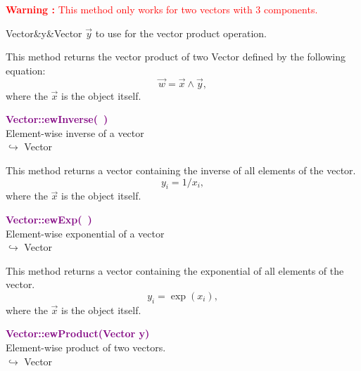 \hspace*{10mm}\textcolor{red}{\textbf{Warning :} This method only works for two vectors with 3 components.}

\begin{tcolorbox}[width=\textwidth,myArgs,tabularx={ll|R}]
Vector&y&Vector $\overrightarrow{y}$ to use for the vector product operation.
\end{tcolorbox}

This method returns the vector product of two Vector defined by the following equation:
\begin{equation*}
\overrightarrow{w} = \overrightarrow{x}\land\overrightarrow{y},
\end{equation*}
where the $\overrightarrow{x}$ is the object itself.

\textcolor{purple}{\textbf{Vector::ewInverse(~)}}\label{Vector::ewInverse()}\\
Element-wise inverse of a vector\\ \hspace*{10mm}$\hookrightarrow$ Vector

This method returns a vector containing the inverse of all elements of the vector.
\begin{equation*}
y_i = 1/x_i,
\end{equation*}
where the $\overrightarrow{x}$ is the object itself.

\textcolor{purple}{\textbf{Vector::ewExp(~)}}\label{Vector::ewExp()}\\
Element-wise exponential of a vector\\ \hspace*{10mm}$\hookrightarrow$ Vector

This method returns a vector containing the exponential of all elements of the vector.
\begin{equation*}
y_i = \exp(x_i),
\end{equation*}
where the $\overrightarrow{x}$ is the object itself.

\textcolor{purple}{\textbf{Vector::ewProduct(Vector y)}}\label{Vector::ewProduct(Vector y)}\\
Element-wise product of two vectors.\\ \hspace*{10mm}$\hookrightarrow$ Vector

